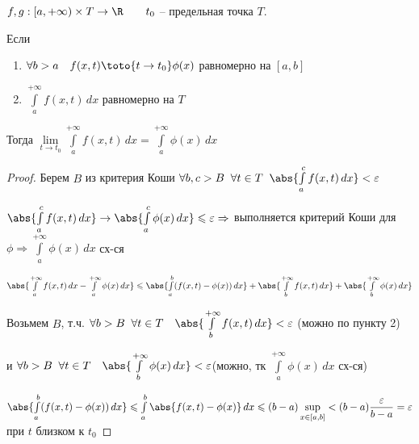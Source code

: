 
\begin{theorem}\thmslashn
	
	$f, g: [a, +\infty)\times T \to \R \qquad t_0$ -- предельная точка $T$. 
	
	Если \begin{enumerate}[1)]
		\item 
		$\forall b > a \quad f(x,t) \toto{t\to t_0} \phi(x)$ равномерно на $[a, b]$
		
		\item
		$\int\limits_{a}^{+\infty} f(x, t)\,dx$ равномерно на $T$
	\end{enumerate}
	
	Тогда $\lim\limits_{t\to t_0}\int\limits_{a}^{+\infty} f(x, t)\,dx = \int\limits_{a}^{+\infty} \phi(x)\,dx$
	
\end{theorem}

\begin{proof}\thmslashn
	
	Берем $B$ из критерия Коши $\forall b, c > B \;\; \forall t \in T \;\;\abs{\int\limits_{a}^{c} f(x, t)\,dx} < \varepsilon$
	
	$\abs{\int\limits_{a}^{c} f(x, t)\,dx} \to \abs{\int\limits_{a}^{c} \phi(x)\,dx} \leqslant \varepsilon \Rightarrow$ выполняется критерий Коши для $\phi \Rightarrow \int\limits_{a}^{+\infty} \phi(x)\,dx$ сх-ся
	
	$\abs{\int\limits_{a}^{+\infty} f(x, t)\,dx - \int\limits_{a}^{+\infty} \phi(x)\,dx} \leqslant \abs{\int\limits_{a}^{b} (f(x, t) - \phi(x))\,dx} + \abs{\int\limits_{b}^{+\infty} f(x, t)\,dx} + \abs{\int\limits_{b}^{+\infty} \phi(x)\,dx}$
	
	Возьмем $B$, т.ч. $ \forall b > B \;\; \forall t \in T \quad \abs{\int\limits_{b}^{+\infty} f(x, t)\,dx} < \varepsilon$ (можно по пункту 2)
	
	и $\forall b > B \;\; \forall t \in T \quad \abs{\int\limits_{b}^{+\infty} \phi(x)\,dx} < \varepsilon $(можно, тк  $\int\limits_{a}^{+\infty} \phi(x)\,dx$ сх-ся)
	
	$ \abs{\int\limits_{a}^{b} (f(x, t) - \phi(x))\,dx} \leqslant  \int\limits_{a}^{b} \abs{f(x, t) - \phi(x)}\,dx \leqslant (b-a) \sup\limits_{x\in [a, b]} < (b-a) \dfrac{\varepsilon}{b-a} = \varepsilon$ при $t$ близком к $t_0$
	
\end{proof}

